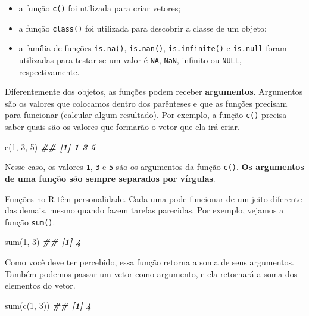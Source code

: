\documentclass[
]{book}
\newenvironment{Shaded}{\begin{snugshade}}{\end{snugshade}}
\newcommand{\DecValTok}[1]{\textcolor[rgb]{0.00,0.00,0.81}{#1}}
\newcommand{\DocumentationTok}[1]{\textcolor[rgb]{0.56,0.35,0.01}{\textbf{\textit{#1}}}}
\newcommand{\FunctionTok}[1]{\textcolor[rgb]{0.00,0.00,0.00}{#1}}
\newcommand{\NormalTok}[1]{#1}
\providecommand{\tightlist}{%
  \setlength{\itemsep}{0pt}\setlength{\parskip}{0pt}}
\begin{document}
\begin{itemize}
\tightlist
\item
  a função \texttt{c()} foi utilizada para criar vetores;
\item
  a função \texttt{class()} foi utilizada para descobrir a classe de um objeto;
\item
  a família de funções \texttt{is.na()}, \texttt{is.nan()}, \texttt{is.infinite()} e \texttt{is.null} foram utilizadas para testar se um valor é \texttt{NA}, \texttt{NaN}, infinito ou \texttt{NULL}, respectivamente.
\end{itemize}

Diferentemente dos objetos, as funções podem receber \textbf{argumentos}. Argumentos são os valores que colocamos dentro dos parênteses e que as funções precisam para funcionar (calcular algum resultado). Por exemplo, a função \texttt{c()} precisa saber quais são os valores que formarão o vetor que ela irá criar.

\begin{Shaded}
\begin{Highlighting}[]
\FunctionTok{c}\NormalTok{(}\DecValTok{1}\NormalTok{, }\DecValTok{3}\NormalTok{, }\DecValTok{5}\NormalTok{)}
\DocumentationTok{\#\# [1] 1 3 5}
\end{Highlighting}
\end{Shaded}

Nesse caso, os valores \texttt{1}, \texttt{3} e \texttt{5} são os argumentos da função \texttt{c()}. \textbf{Os argumentos de uma função são sempre separados por vírgulas}.

Funções no R têm personalidade. Cada uma pode funcionar de um jeito diferente das demais, mesmo quando fazem tarefas parecidas. Por exemplo, vejamos a função \texttt{sum()}.

\begin{Shaded}
\begin{Highlighting}[]
\FunctionTok{sum}\NormalTok{(}\DecValTok{1}\NormalTok{, }\DecValTok{3}\NormalTok{)}
\DocumentationTok{\#\# [1] 4}
\end{Highlighting}
\end{Shaded}

Como você deve ter percebido, essa função retorna a soma de seus argumentos. Também podemos passar um vetor como argumento, e ela retornará a soma dos elementos do vetor.

\begin{Shaded}
\begin{Highlighting}[]
\FunctionTok{sum}\NormalTok{(}\FunctionTok{c}\NormalTok{(}\DecValTok{1}\NormalTok{, }\DecValTok{3}\NormalTok{))}
\DocumentationTok{\#\# [1] 4}
\end{Highlighting}
\end{Shaded}
\end{document}
